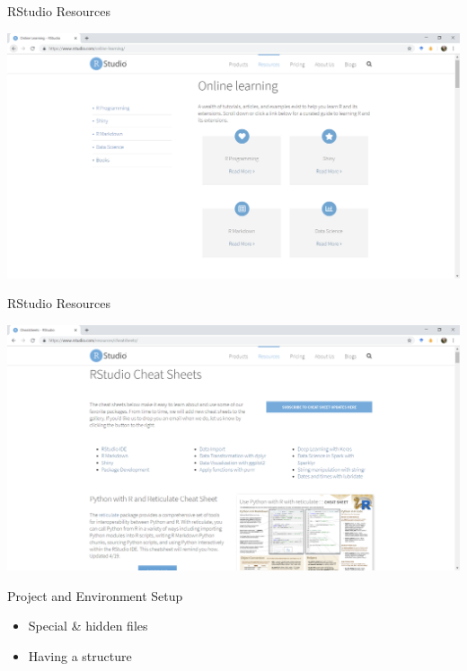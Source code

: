 \documentclass[
  ignorenonframetext,
]{beamer}
\providecommand{\tightlist}{%
  \setlength{\itemsep}{0pt}\setlength{\parskip}{0pt}}
\begin{document}
\begin{frame}{RStudio Resources}
\protect\hypertarget{rstudio-resources-1}{}

\includegraphics{../external/images/rstudio_dot_com_2_learning.PNG}

\end{frame}

\begin{frame}{RStudio Resources}
\protect\hypertarget{rstudio-resources-2}{}

\includegraphics{../external/images/rstudio_dot_com_3_cheats.PNG}

\end{frame}

\begin{frame}{Project and Environment Setup}
\protect\hypertarget{project-and-environment-setup}{}

\begin{itemize}
\tightlist
\item
  Special \& hidden files
\item
  Having a structure
\end{itemize}

\end{frame}
\end{document}
